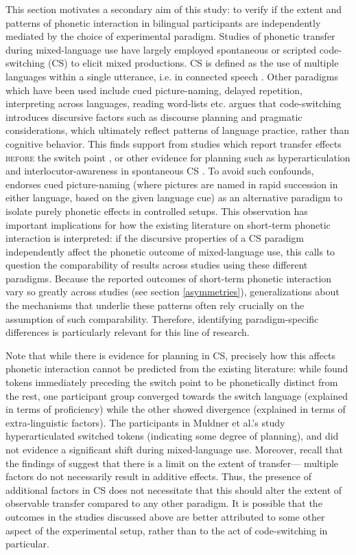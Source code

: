 \documentclass[12 pt]{article}
\begin{document}
This section motivates a secondary aim of this study: to verify if the extent and patterns of phonetic interaction in bilingual participants are independently mediated by the choice of experimental paradigm. Studies of phonetic transfer during mixed-language use have largely employed spontaneous or scripted code-switching (CS) to elicit mixed productions. CS is defined as the use of multiple languages within a single utterance, i.e. in connected speech \citep{myers1993dueling}. Other paradigms which have been used include cued picture-naming, delayed repetition, interpreting across languages, reading word-lists etc. \cite{olson2013bilingual} argues that code-switching introduces discursive factors such as discourse planning and pragmatic considerations, which ultimately reflect patterns of language practice, rather than cognitive behavior. This finds support from studies which report transfer effects \textsc{before} the switch point \citep{bullock2009trying}, or other evidence for planning such as hyperarticulation \citep{muldner2019phonetics} and interlocutor-awareness in spontaneous CS \citep{khattab2013phonetic}. To avoid such confounds, \cite{olson2013bilingual} endorses cued picture-naming (where pictures are named in rapid succession in either language, based on the given language cue) as an alternative paradigm to isolate purely phonetic effects in controlled setups. This observation has important implications for how the existing literature on short-term phonetic interaction is interpreted: if the discursive properties of a CS paradigm independently affect the phonetic outcome of mixed-language use, this calls to question the comparability of results across studies using these different paradigms. Because the reported outcomes of short-term phonetic interaction vary so greatly across studies (see section \ref{asymmetries}), generalizations about the mechanisms that underlie these patterns often rely crucially on the assumption of such comparability. Therefore, identifying paradigm-specific differences is particularly relevant for this line of research.

Note that while there is evidence for planning in CS, precisely how this affects phonetic interaction cannot be predicted from the existing literature: while \cite{bullock2009trying} found tokens immediately preceding the switch point to be phonetically distinct from the rest, one participant group converged towards the switch language (explained in terms of proficiency) while the other showed divergence (explained in terms of extra-linguistic factors). The participants in Muldner et al.'s \citeyearpar{muldner2019phonetics} study hyperarticulated switched tokens (indicating some degree of planning), and did not evidence a significant shift during mixed-language use. Moreover, recall that the findings of \cite{olson2016role} suggest that there is a limit on the extent of transfer--- multiple factors do not necessarily result in additive effects. Thus, the presence of additional factors in CS does not necessitate that this should alter the extent of observable transfer compared to any other paradigm. It is possible that the outcomes in the studies discussed above are better attributed to some other aspect of the experimental setup, rather than to the act of code-switching in particular.
\end{document}
